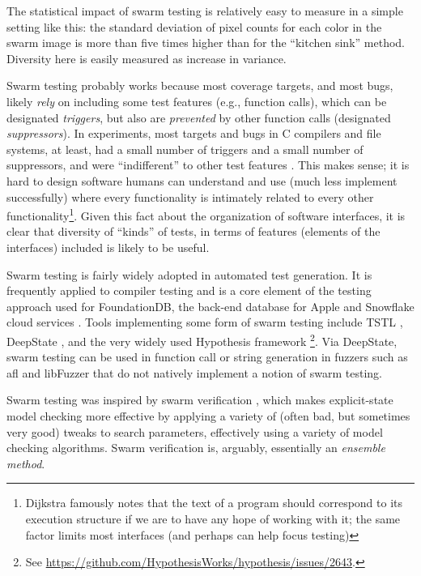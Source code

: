 \documentclass[sigplan,screen]{acmart}
\begin{document}
The statistical impact of swarm testing is relatively easy to measure
in a simple setting like this: the standard deviation of pixel counts
for each color in the swarm image is more than five times higher than
for the ``kitchen sink'' method.  Diversity here is easily measured as
increase in variance.

Swarm testing probably works because most coverage targets, and most
bugs, likely \emph{rely} on including some test features (e.g.,
function calls), which can be designated \emph{triggers}, but also are
\emph{prevented} by other function calls (designated
\emph{suppressors}).  In experiments, most targets and bugs in C
compilers and file systems, at least, had a small number of triggers
and a small number of suppressors, and were ``indifferent'' to other
test features \cite{groce2013help}.  This makes sense; it is hard to
design software humans can understand and use (much less implement
successfully) where every
functionality is intimately related to every other functionality\footnote{Dijkstra famously \cite{ewd} notes that the text of a
program should correspond to its execution structure if we are to have
any hope of working with it; the same factor limits most interfaces
(and perhaps can help focus testing)}.
Given this fact about the organization of software interfaces, it is
clear that diversity of ``kinds'' of tests, in terms of features
(elements of the interfaces) included is likely to be useful.

Swarm testing is fairly widely adopted in automated test generation.  It is frequently
applied to compiler testing \cite{le2014compiler,dewey2015fuzzing} and
is a core element of the testing approach used for FoundationDB, the
back-end database for Apple and Snowflake cloud services
\cite{zhou2021foundationdb}.  Tools implementing some form of swarm
testing include TSTL \cite{tstlsttt}, DeepState \cite{goodman2018deepstate}, and the very widely used Hypothesis
framework \cite{hypothesis}\footnote{See \url{https://github.com/HypothesisWorks/hypothesis/issues/2643}.}.
Via DeepState, swarm testing can be used in function call or
string generation in fuzzers such as afl and libFuzzer that do not
natively implement a notion of swarm testing.

Swarm testing was inspired by swarm verification \cite{swarmIEEE},
which makes explicit-state model checking more effective by applying a
variety of (often bad, but sometimes very good) tweaks to search
parameters, effectively using a variety of model checking algorithms.
Swarm verification is, arguably, essentially an \emph{ensemble method}.
\end{document}
